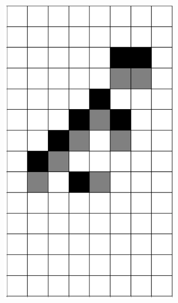 \documentclass[12pt]{article}
\numberwithin{figure}{section} %
\begin{document}
\begin{figure}[H]
\begin{subfigure}{0.19\textwidth}
     \includegraphics[width=\linewidth]{Section4/17.3}
     \subcaption{}
   \end{subfigure}
           \begin{subfigure}{0.19\textwidth}
     \centering

\end{subfigure}
\end{figure}
\end{document}
